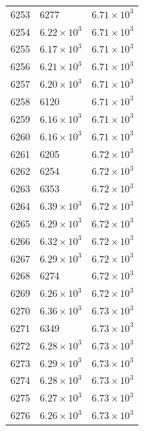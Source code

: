 \begin{table}[H]
\begin{tabular}{lll}
6253 & 6277 & $\displaystyle 6.71 \times 10^{3}$ \\
6254 & $\displaystyle 6.22 \times 10^{3}$ & $\displaystyle 6.71 \times 10^{3}$ \\
6255 & $\displaystyle 6.17 \times 10^{3}$ & $\displaystyle 6.71 \times 10^{3}$ \\
6256 & $\displaystyle 6.21 \times 10^{3}$ & $\displaystyle 6.71 \times 10^{3}$ \\
6257 & $\displaystyle 6.20 \times 10^{3}$ & $\displaystyle 6.71 \times 10^{3}$ \\
6258 & 6120 & $\displaystyle 6.71 \times 10^{3}$ \\
6259 & $\displaystyle 6.16 \times 10^{3}$ & $\displaystyle 6.71 \times 10^{3}$ \\
6260 & $\displaystyle 6.16 \times 10^{3}$ & $\displaystyle 6.71 \times 10^{3}$ \\
6261 & 6205 & $\displaystyle 6.72 \times 10^{3}$ \\
6262 & 6254 & $\displaystyle 6.72 \times 10^{3}$ \\
6263 & 6353 & $\displaystyle 6.72 \times 10^{3}$ \\
6264 & $\displaystyle 6.39 \times 10^{3}$ & $\displaystyle 6.72 \times 10^{3}$ \\
6265 & $\displaystyle 6.29 \times 10^{3}$ & $\displaystyle 6.72 \times 10^{3}$ \\
6266 & $\displaystyle 6.32 \times 10^{3}$ & $\displaystyle 6.72 \times 10^{3}$ \\
6267 & $\displaystyle 6.29 \times 10^{3}$ & $\displaystyle 6.72 \times 10^{3}$ \\
6268 & 6274 & $\displaystyle 6.72 \times 10^{3}$ \\
6269 & $\displaystyle 6.26 \times 10^{3}$ & $\displaystyle 6.72 \times 10^{3}$ \\
6270 & $\displaystyle 6.36 \times 10^{3}$ & $\displaystyle 6.73 \times 10^{3}$ \\
6271 & 6349 & $\displaystyle 6.73 \times 10^{3}$ \\
6272 & $\displaystyle 6.28 \times 10^{3}$ & $\displaystyle 6.73 \times 10^{3}$ \\
6273 & $\displaystyle 6.29 \times 10^{3}$ & $\displaystyle 6.73 \times 10^{3}$ \\
6274 & $\displaystyle 6.28 \times 10^{3}$ & $\displaystyle 6.73 \times 10^{3}$ \\
6275 & $\displaystyle 6.27 \times 10^{3}$ & $\displaystyle 6.73 \times 10^{3}$ \\
6276 & $\displaystyle 6.26 \times 10^{3}$ & $\displaystyle 6.73 \times 10^{3}$ \\

\end{tabular}
\end{table}
